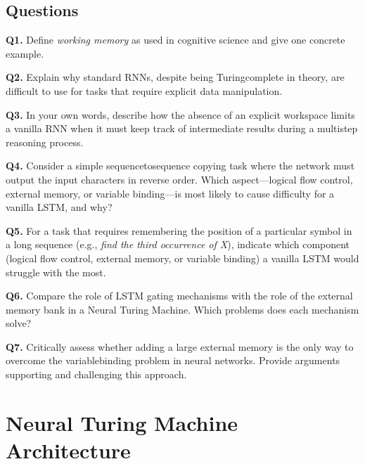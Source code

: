 \documentclass[12pt, a4paper]{article}
\begin{document}
\newpage
\subsection{Questions}

\textbf{Q1.} Define \textit{working memory} as used in cognitive science and give one concrete example.

\textbf{Q2.} Explain why standard RNNs, despite being Turingcomplete in theory, are difficult to use for tasks that require explicit data manipulation.

\textbf{Q3.} In your own words, describe how the absence of an explicit workspace limits a vanilla RNN when it must keep track of intermediate results during a multistep reasoning process.

\textbf{Q4.} Consider a simple sequencetosequence copying task where the network must output the input characters in reverse order. Which aspect---logical flow control, external memory, or variable binding---is most likely to cause difficulty for a vanilla LSTM, and why?

\textbf{Q5.} For a task that requires remembering the position of a particular symbol in a long sequence (e.g., \textit{find the third occurrence of X}), indicate which component (logical flow control, external memory, or variable binding) a vanilla LSTM would struggle with the most.

\textbf{Q6.} Compare the role of LSTM gating mechanisms with the role of the external memory bank in a Neural Turing Machine. Which problems does each mechanism solve?

\textbf{Q7.} Critically assess whether adding a large external memory is the only way to overcome the variablebinding problem in neural networks. Provide arguments supporting and challenging this approach.

\newpage

\section{Neural Turing Machine Architecture}
\end{document}
